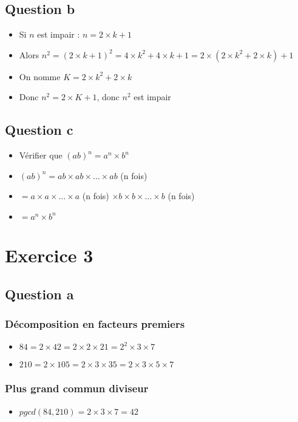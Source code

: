 \documentclass[a4paper,12pt]{article}
\begin{document}
\subsection{Question b}
\begin{itemize}
    \item Si $n$ est impair : $n = 2 \times k + 1$
    \item Alors $n^2 = (2 \times k + 1)^2 = 4 \times k^2 + 4 \times k + 1 = 2 \times (2 \times k^2 + 2 \times k) + 1$
    \item On nomme $K = 2 \times k^2 + 2 \times k$
    \item Donc $n^2 = 2 \times K + 1$, donc $n^2$ est impair
\end{itemize}

\subsection{Question c}
\begin{itemize}
    \item Vérifier que $(ab)^n = a^n \times b^n$
    \item $(ab)^n = ab \times ab \times \dots \times ab$ (n fois)
    \item $= a \times a \times \dots \times a$ (n fois) $\times b \times b \times \dots \times b$ (n fois)
    \item $= a^n \times b^n$
\end{itemize}

\clearpage
\section{Exercice 3}
\subsection{Question a}
\subsubsection{Décomposition en facteurs premiers}
\begin{itemize}
    \item $84 = 2 \times 42 = 2 \times 2 \times 21 = 2^2 \times 3 \times 7$
    \item $210 = 2 \times 105 = 2 \times 3 \times 35 = 2 \times 3 \times 5 \times 7$
\end{itemize}

\subsubsection{Plus grand commun diviseur}
\begin{itemize}
    \item $pgcd(84,210) = 2 \times 3 \times 7 = 42$
\end{itemize}
\end{document}

